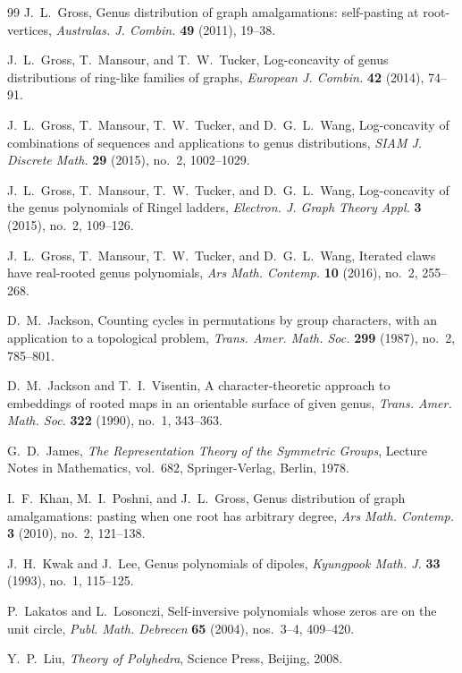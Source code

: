 \documentclass[12pt]{article}
\theoremstyle{definition}
\begin{document}
\begin{thebibliography}{99}
J.~L.~Gross,
Genus distribution of graph amalgamations: self-pasting at root-vertices,
\emph{Australas. J. Combin.} \textbf{49} (2011), 19--38.


J.~L.~Gross, T.~Mansour, and T.~W.~Tucker,
Log-concavity of genus distributions of ring-like families of graphs,
\emph{European J. Combin.} \textbf{42} (2014), 74--91.

J.~L.~Gross, T.~Mansour, T.~W.~Tucker, and D.~G.~L.~Wang,
Log-concavity of combinations of sequences and applications to genus distributions,
\emph{SIAM J. Discrete Math.} \textbf{29} (2015), no.~2, 1002--1029.


J.~L.~Gross, T.~Mansour, T.~W.~Tucker, and D.~G.~L.~Wang,
Log-concavity of the genus polynomials of Ringel ladders,
\emph{Electron. J. Graph Theory Appl.} \textbf{3} (2015), no.~2, 109--126.

J.~L.~Gross, T.~Mansour, T.~W.~Tucker, and D.~G.~L.~Wang,
Iterated claws have real-rooted genus polynomials,
\emph{Ars Math. Contemp.} \textbf{10} (2016), no.~2, 255--268.

D.~M.~Jackson,
Counting cycles in permutations by group characters, with an application to a topological problem,
\emph{Trans. Amer. Math. Soc.} \textbf{299} (1987), no.~2, 785--801.

D.~M.~Jackson and T.~I.~Visentin,
A character-theoretic approach to embeddings of rooted maps in an orientable surface of given genus,
\emph{Trans. Amer. Math. Soc.} \textbf{322} (1990), no.~1, 343--363.

G.~D.~James,
\emph{The Representation Theory of the Symmetric Groups},
Lecture Notes in Mathematics, vol.~682, Springer-Verlag, Berlin, 1978.


I.~F.~Khan, M.~I.~Poshni, and J.~L.~Gross,
Genus distribution of graph amalgamations: pasting when one root has arbitrary degree,
\emph{Ars Math. Contemp.} \textbf{3} (2010), no.~2, 121--138.

J.~H.~Kwak and J.~Lee,
Genus polynomials of dipoles,
\emph{Kyungpook Math. J.} \textbf{33} (1993), no.~1, 115--125.

P.~Lakatos and L.~Losonczi,
Self-inversive polynomials whose zeros are on the unit circle,
\emph{Publ. Math. Debrecen} \textbf{65} (2004), nos.~3--4, 409--420.

Y.~P.~Liu,
\emph{Theory of Polyhedra},
Science Press, Beijing, 2008.


\end{thebibliography}
\end{document}
